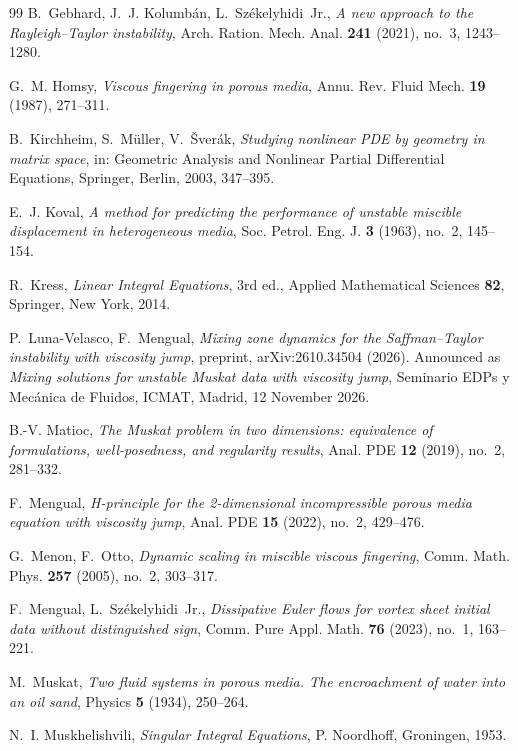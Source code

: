 \begin{thebibliography}{99}
B.~Gebhard, J.~J. Kolumb\'an, L.~Sz\'ekelyhidi~Jr., \emph{A new approach to the Rayleigh--Taylor instability}, Arch. Ration. Mech. Anal. \textbf{241} (2021), no.~3, 1243--1280.

G.~M. Homsy, \emph{Viscous fingering in porous media}, Annu. Rev. Fluid Mech. \textbf{19} (1987), 271--311.

B.~Kirchheim, S.~M\"uller, V.~\v{S}ver\'ak, \emph{Studying nonlinear PDE by geometry in matrix space}, in: Geometric Analysis and Nonlinear Partial Differential Equations, Springer, Berlin, 2003, 347--395.

E.~J. Koval, \emph{A method for predicting the performance of unstable miscible displacement in heterogeneous media}, Soc. Petrol. Eng. J. \textbf{3} (1963), no.~2, 145--154.

R.~Kress, \emph{Linear Integral Equations}, 3rd ed., Applied Mathematical Sciences \textbf{82}, Springer, New York, 2014.

P.~Luna-Velasco, F.~Mengual, \emph{Mixing zone dynamics for the Saffman--Taylor instability with viscosity jump}, preprint, arXiv:2610.34504 (2026). Announced as \emph{Mixing solutions for unstable
Muskat data with viscosity jump}, Seminario EDPs y Mec\'anica de Fluidos, ICMAT, Madrid, 12 November 2026.

B.-V. Matioc, \emph{The Muskat problem in two dimensions: equivalence of formulations, well-posedness, and regularity results}, Anal. PDE \textbf{12} (2019), no.~2, 281--332.

F.~Mengual, \emph{H-principle for the 2-dimensional incompressible porous media equation with viscosity jump}, Anal. PDE \textbf{15} (2022), no.~2, 429--476.

G.~Menon, F.~Otto, \emph{Dynamic scaling in miscible viscous fingering}, Comm. Math. Phys. \textbf{257} (2005), no.~2, 303--317.

F.~Mengual, L.~Sz\'ekelyhidi~Jr., \emph{Dissipative Euler flows for vortex sheet initial data without distinguished sign}, Comm. Pure Appl. Math. \textbf{76} (2023), no.~1, 163--221.

M.~Muskat, \emph{Two fluid systems in porous media. The encroachment of water into an oil sand}, Physics \textbf{5} (1934), 250--264.

N.~I. Muskhelishvili, \emph{Singular Integral Equations}, P. Noordhoff, Groningen, 1953.


\end{thebibliography}
